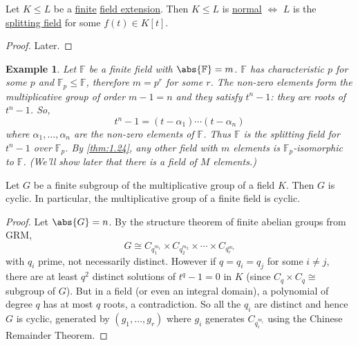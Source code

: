 \documentclass{article}
\newtheorem{nexample}[nthm]{Example}
\newcommand{\F}{\mathbb{F}}
\begin{document}

\begin{nthm}\label{thm:1.26}
    Let $K \leq L$ be a \hyperlink{def:degreeOfFieldExt}{finite} \hyperlink{def:fieldExt}{field extension}. Then $K \leq L$ is \hyperlink{def:normal}{normal} $\iff$ $L$ is the \hyperlink{def:splitting}{splitting field} for some $f(t) \in K[t]$.
\end{nthm}

\begin{proof}
    Later.
\end{proof}

\begin{nexample}\label{thm:1.27}
    Let $\F$ be a finite field with $\abs{\mathbb{F}} = m$. $\F$ has characteristic $p$ for some $p$ and $\F_p \leq \F$, therefore $m = p^r$ for some $r$.
    The non-zero elements form the multiplicative group of order $m-1=n$ and they satisfy $t^n - 1$: they are roots of $t^n - 1$. So,
    \begin{equation*}
        t^n - 1 = (t - \alpha_1) \dotsm (t-\alpha_n)
    \end{equation*}
    where $\alpha_1, \dotsc, \alpha_n$  are the non-zero elements of $\F$. Thus $\F$ is the splitting field for $t^n - 1$ over $\F_p$.
    By \cref{thm:1.24}, any other field with $m$ elements is $\F_p$-isomorphic to $\F$.
    (We'll show later that there is a field of $M$ elements.)
\end{nexample}

\begin{nthm}\label{thm:1.28}
    Let $G$ be a finite subgroup of the multiplicative group of a field $K$. Then $G$ is cyclic. In particular, the multiplicative group of a finite field is cyclic.
\end{nthm}

\begin{proof}
    Let $\abs{G} = n$. By the structure theorem of finite abelian groups from GRM,
    \begin{equation*}
        G \cong C_{q_1^{m_1}} \times C_{q_2^{m_2}} \times \dotsm \times C_{q_r^{m_r}}
    \end{equation*}
    with $q_i$ prime, not necessarily distinct.
    However if $q = q_i = q_j$ for some $i \neq j$, there are at least $q^2$ distinct solutions of $t^q - 1 = 0$ in $K$ (since $C_q \times C_q \cong$ subgroup of $G$).
    But in a field (or even an integral domain), a polynomial of degree $q$ has at most $q$ roots, a contradiction.
    So all the $q_i$ are distinct and hence $G$ is cyclic, generated by $(g_1, \dotsc, g_r)$ where $g_i$ generates $C_{q_i^{m_i}}$ using the Chinese Remainder Theorem.
\end{proof}
\end{document}

